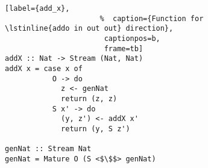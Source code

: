 \begin{figure}[!t]
  \centering
  \begin{minipage}{\columnwidth}
    \begin{lstlisting}[label={add_x},
                      %  caption={Function for \lstinline{addo in out out} direction},
                       captionpos=b,
                       frame=tb]
addX :: Nat -> Stream (Nat, Nat)
addX x = case x of
           O -> do
             z <- genNat
             return (z, z)
           S x' -> do
             (y, z') <- addX x'
             return (y, S z')

genNat :: Stream Nat
genNat = Mature O (S <$\$$> genNat)
    \end{lstlisting}
  \end{minipage}
\end{figure}
